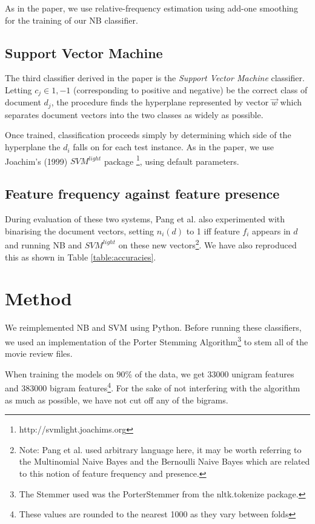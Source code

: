 \documentclass[12pt]{article}
\begin{document}
\begin{multicols}{2}
As in the paper, we use relative-frequency estimation using add-one smoothing for the training of our NB classifier.

\subsection{Support Vector Machine}

The third classifier derived in the paper is the \emph{Support Vector Machine} classifier. Letting $c_{j} \in {1, -1}$ (corresponding to positive and negative) be the correct class of document $d_{j}$, the procedure finds the hyperplane represented by vector $\vec{w}$ which separates document vectors into the two classes as widely as possible.

Once trained, classification proceeds simply by determining which side of the hyperplane the $d_{i}$ falls on for each test instance. As in the paper, we use Joachim's (1999) $SVM^{light}$ package \footnote{http://svmlight.joachims.org}, using default parameters.

\subsection{Feature frequency against feature presence}

During evaluation of these two systems, Pang et al. also experimented with binarising the document vectors, setting $n_{i}(d)$ to 1 iff feature $f_{i}$ appears in $d$ and running NB and $SVM^{light}$ on these new vectors\footnote{Note: Pang et al. used arbitrary language here, it may be worth referring to the Multinomial Naive Bayes and the Bernoulli Naive Bayes which are related to this notion of feature frequency and presence.}. We have also reproduced this as shown in Table \ref{table:accuracies}.

\section{Method}

We reimplemented NB and SVM using Python. Before running these classifiers, we used an implementation of the Porter Stemming Algorithm\footnote{The Stemmer used was the PorterStemmer from the nltk.tokenize package.} to stem all of the movie review files.

When training the models on 90\% of the data, we get 33000 unigram features and 383000 bigram features\footnote{These values are rounded to the nearest 1000 as they vary between folds}. For the sake of not interfering with the algorithm as much as possible, we have not cut off any of the bigrams.


\end{multicols}
\end{document}

